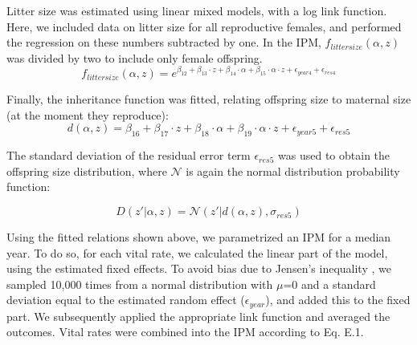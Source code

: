 Litter size was estimated using linear mixed models, with a log link function. Here, we included data on litter size for all reproductive females, and performed the regression on these numbers subtracted by one. In the IPM, $f_{litter size}(\alpha,z)$ was divided by two to include only female offspring.
\begin{equation}
f_{litter size}(\alpha,z) = e^{\beta_{12} + \beta_{13} \cdot z + \beta_{14} \cdot \alpha + \beta_{15} \cdot \alpha \cdot z + \epsilon_{year4} + \epsilon_{res4}}
\end{equation}

Finally, the inheritance function was fitted, relating offspring size to maternal size (at the moment they reproduce):
\begin{equation}
d(\alpha,z) = \beta_{16} + \beta_{17} \cdot z + \beta_{18} \cdot \alpha + \beta_{19} \cdot \alpha \cdot z + \epsilon_{year5} + \epsilon_{res5}
\end{equation}

The standard deviation of the residual error term $\epsilon_{res5}$ was used to obtain the offspring size distribution, where $\mathcal{N}$ is again the normal distribution probability function:

\begin{equation}
D(z'|\alpha,z) = \mathcal{N}(z'|d(\alpha,z),\sigma_{res5})
\end{equation}

Using the fitted relations shown above, we parametrized an IPM for a median year. To do so, for each vital rate, we calculated the linear part of the model, using the estimated fixed effects. To avoid bias due to Jensen's inequality \parencite[e.g.][]{Fox2002}, we sampled 10,000 times from a normal distribution with $\mu$=0 and a standard deviation equal to the estimated random effect ($\epsilon_{year}$), and added this to the fixed part. We subsequently applied the appropriate link function and averaged the outcomes. Vital rates were combined into the IPM according to Eq. E.1.




